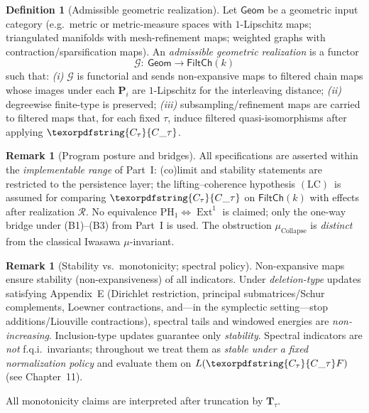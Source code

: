 \documentclass[11pt]{article}
\DeclareMathOperator{\Ext}{Ext}
\DeclareRobustCommand{\hyp}{\nobreakdash-}
\newcommand{\Rfun}{\mathcal{R}}
\numberwithin{equation}{section}
\theoremstyle{definition}
\newtheorem{definition}[theorem]{Definition}
\newtheorem{remark}[theorem]{Remark}
\DeclareRobustCommand{\FiltCh}[1]{\mathsf{FiltCh}(#1)}
\DeclareRobustCommand{\Ttau}{\texorpdfstring{\ensuremath{\mathbf{T}_{\tau}}}{T\_\tau}}
\DeclareRobustCommand{\Ctau}{\texorpdfstring{\ensuremath{C_{\tau}}}{C\_\tau}}
\DeclareRobustCommand{\muc}{\mu_{\mathrm{Collapse}}}
\DeclareRobustCommand{\LC}{\texorpdfstring{\ensuremath{\mathrm{(LC)}}}{(LC)}}
\begin{document}
\begin{definition}[Admissible geometric realization]\label{def:geom-real}
Let \(\mathsf{Geom}\) be a geometric input category (e.g.\ metric or metric\hyp measure spaces with \(1\)\hyp Lipschitz maps; triangulated manifolds with mesh\hyp refinement maps; weighted graphs with contraction/sparsification maps). An \emph{admissible geometric realization} is a functor
\[
  \mathcal{G}:\ \mathsf{Geom}\longrightarrow \FiltCh{k}
\]
such that:
\emph{(i)} \(\mathcal{G}\) is functorial and sends non\hyp expansive maps to filtered chain maps whose images under each \(\mathbf{P}_i\) are \(1\)\hyp Lipschitz for the interleaving distance;
\emph{(ii)} degreewise finite\hyp type is preserved;
\emph{(iii)} subsampling/refinement maps are carried to filtered maps that, for each fixed \(\tau\), induce filtered quasi\hyp isomorphisms after applying \(\Ctau\).
\end{definition}

\begin{remark}[Program posture and bridges]\label{rk:LC}
All specifications are asserted within the \emph{implementable range} of Part~I: (co)limit and stability statements are restricted to the persistence layer; the lifting–coherence hypothesis \LC\ is assumed for comparing \(\Ctau\) on \(\FiltCh{k}\) with effects after realization \(\Rfun\).
No equivalence \(\mathrm{PH}_1\Leftrightarrow\Ext^1\) is claimed; only the one\hyp way bridge under \textup{(B1)–(B3)} from Part~I is used.
The obstruction \(\muc\) is \emph{distinct} from the classical Iwasawa \(\mu\)\hyp invariant.
\end{remark}

\begin{remark}[Stability vs.\ monotonicity; spectral policy]\label{rem:stability-vs-monotonicity}
Non\hyp expansive maps ensure stability (non\hyp expansiveness) of all indicators.
Under \emph{deletion\hyp type} updates satisfying Appendix~E (Dirichlet restriction, principal submatrices/Schur complements, Loewner contractions, and—in the symplectic setting—stop additions/Liouville contractions), spectral tails and windowed energies are \emph{non\hyp increasing}. Inclusion\hyp type updates guarantee only \emph{stability}.
Spectral indicators are \emph{not} f.q.i.\ invariants; throughout we treat them as \emph{stable under a fixed normalization policy} and evaluate them on \(L(\Ctau F)\) (see Chapter~11).
\end{remark}

All monotonicity claims are interpreted after truncation by \Ttau.
\end{document}
